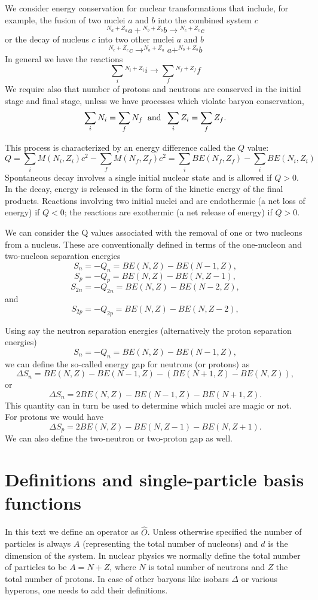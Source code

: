 \begin{itemize}
We consider energy conservation for nuclear transformations that include, for
example, the fusion of two nuclei $a$ and $b$ into the combined system $c$
\[
{^{N_a+Z_a}}a+ {^{N_b+Z_b}}b\rightarrow {^{N_c+Z_c}}c
\]
or the decay of nucleus $c$ into two other nuclei $a$ and $b$
\[
^{N_c+Z_c}c \rightarrow  ^{N_a+Z_a}a+ ^{N_b+Z_b}b
\]
In general we have the reactions
\[
\sum_i {^{N_i+Z_i}}i \rightarrow  \sum_f {^{N_f+Z_f}}f
\]
We require also that number of protons and neutrons are conserved in the initial stage and final stage, unless we have processes which violate baryon conservation, 
\[
\sum_iN_i = \sum_f N_f \hspace{0.2cm}\mathrm{and} \hspace{0.2cm}\sum_iZ_i = \sum_f Z_f.
\]

This process is characterized by an energy difference called the $Q$ value:
\[
Q=\sum_iM(N_i, Z_i)c^2-\sum_fM(N_f, Z_f)c^2=\sum_iBE(N_f, Z_f)-\sum_iBE(N_i, Z_i)
\]
Spontaneous decay involves a single initial nuclear state and is allowed if $Q > 0$. In the
decay, energy is released in the form of the kinetic energy of the final products. Reactions
involving two initial nuclei and are endothermic (a net loss of energy) if $Q < 0$; the reactions
are exothermic (a net release of energy) if $Q > 0$.

We can consider the Q values associated with the removal of one or two nucleons from
a nucleus. These are conventionally defined in terms of the one-nucleon and two-nucleon
separation energies
\[
S_n= -Q_n= BE(N,Z)-BE(N-1,Z),
\]
\[
S_p= -Q_p= BE(N,Z)-BE(N,Z-1),
\]
\[
S_{2n}= -Q_{2n}= BE(N,Z)-BE(N-2,Z),
\]
and
\[
S_{2p}= -Q_{2p}= BE(N,Z)-BE(N,Z-2),
\]

Using say the neutron separation energies (alternatively the proton separation energies)
\[
S_n= -Q_n= BE(N,Z)-BE(N-1,Z),
\]
we can define the so-called energy gap for neutrons (or protons) as 
\[
\Delta S_n= BE(N,Z)-BE(N-1,Z)-\left(BE(N+1,Z)-BE(N,Z)\right),
\]
or 
\[
\Delta S_n= 2BE(N,Z)-BE(N-1,Z)-BE(N+1,Z).
\]
This quantity can in turn be used to determine which nuclei are magic or not. 
For protons we would have 
\[
\Delta S_p= 2BE(N,Z)-BE(N,Z-1)-BE(N,Z+1).
\]
We can also define the two-neutron or two-proton gap as well. 


\section{Definitions  and single-particle basis functions}

In this text we define an operator as $\hat{O}$. Unless otherwise
specified the number of particles is always $A$ (representing the total number of nucleons) 
and $d$ is the dimension of the 
system. 
In nuclear physics we normally define the total number of particles to be $A=N+Z$,
where $N$ is total number of neutrons and $Z$ the total number of protons. In case of other baryons like isobars $\Delta$ or
various hyperons, one needs to add their definitions.  


\end{itemize}
